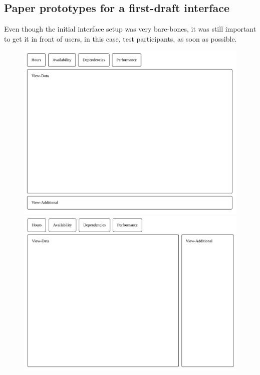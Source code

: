 \documentclass[nofilelist,dvipsnames]{cslthse-msc}
\begin{document}
      \subsection{Paper prototypes for a first-draft interface}

        Even though the initial interface setup was very bare-bones, it was
        still important to get it in front of users, in this case, test
        participants, as soon as possible.

        \begin{figure}[h!]
          \centering
          \begin{minipage}{.49\textwidth}
            \includegraphics[width=\linewidth]{ui11.pdf}
          \end{minipage}
          \begin{minipage}{.49\textwidth}
            \includegraphics[width=\linewidth]{ui12.pdf}

\end{minipage}
\end{figure}
\end{document}
